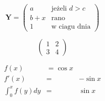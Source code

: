 \documentclass[10pt,a4paper]{article}
\begin{document}
\begin{displaymath}
\mathbf{Y} =
\left( \begin{array}{ccc}
a & \textrm{jeżeli $d>c$}\\
b+x & \textrm{rano}\\
1 & \textrm{w~ciagu dnia}
\end{array} \right)
\end{displaymath}

\begin{displaymath}
\left(\begin{array}{c|c}
1 & 2 \\ \hline
3 & 4
\end{array}\right)
\end{displaymath}

\begin{eqnarray}
f(x) &  =  \cos x \\
f'(x) & = & -\sin x \\
\int_{0}^{x} f(y)dy &
= & \sin x
\end{eqnarray}
\end{document}
